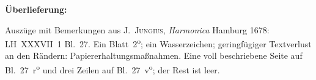 %
%
%
\begin{ledgroupsized}[r]{120mm}
\footnotesize
\pstart
\noindent\textbf{Überlieferung:}
\pend
\end{ledgroupsized}
\begin{ledgroupsized}[r]{114mm}
\footnotesize
\pstart \parindent -6mm
%
Auszüge mit Bemerkungen aus
\cite{01266}J.~\textsc{Jungius}, \textit{Harmonica}
\lbrack Hamburg 1678\rbrack:
LH~XXXVII~1 Bl.~27.
Ein Blatt~2\textsuperscript{o};
ein Wasserzeichen;
geringfügiger Textverlust an den Rändern: Papiererhaltungsmaßnahmen.
Eine voll beschriebene 
Seite auf Bl.~27~r\textsuperscript{o}
und drei Zeilen auf Bl.~27~v\textsuperscript{o};
der Rest ist leer.
\pend
\end{ledgroupsized}
%
\vspace*{5mm}
